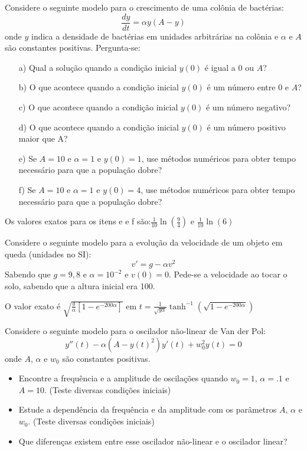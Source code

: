 \begin{exer} Considere o seguinte modelo para o crescimento de uma colônia de bactérias:
$$\frac{dy}{dt}=\alpha y (A-y)$$
onde $y$ indica a densidade de bactérias em unidades arbitrárias na colônia e $\alpha$ e $A$ são constantes positivas.
Pergunta-se:
\begin{itemize}
\item[a)] Qual a solução quando a condição inicial $y(0)$ é igual a $0$ ou $A$?
\item[b)] O que acontece quando a condição inicial $y(0)$ é um número entre $0$ e $A$?
\item[c)] O que acontece quando a condição inicial $y(0)$ é um número negativo?
\item[d)] O que acontece quando a condição inicial $y(0)$ é um número positivo maior que A?
\item[e)] Se $A=10$ e $\alpha=1$ e $y(0)=1$, use métodos numéricos para obter tempo necessário para que a população dobre?
\item[f)] Se $A=10$ e $\alpha=1$ e $y(0)=4$, use métodos numéricos para obter tempo necessário para que a população dobre?
\end{itemize}
\end{exer}
\begin{resp}
  
Os valores exatos para os itens e e f são:$\frac{1}{10}\ln\left(\frac{9}{4}\right)$ e $\frac{1}{10}\ln\left(6\right)$    
  
\end{resp}

\begin{exer} Considere o seguinte modelo para a evolução da velocidade de um objeto em queda (unidades no SI):
$$v'=g-\alpha v^2$$
Sabendo que $g=9,8$ e $\alpha=10^{-2}$ e $v(0)=0$. Pede-se a velocidade ao tocar o solo, sabendo que a altura inicial era 100.

\end{exer}
\begin{resp}
  
O valor exato é $\sqrt{\frac{g}{\alpha}\left[1-e^{{-200\alpha}}\right]}$ em $t=\frac{1}{\sqrt{g\alpha}}\tanh^{-1}\left(\sqrt{1-e^{{-200\alpha}}}\right)$    
  
\end{resp}


\begin{exer} Considere o seguinte modelo para o oscilador não-linear de Van der Pol:
$$y''(t) - \alpha (A-y(t)^2)y'(t) + w_0^2y(t)=0$$
onde $A$, $\alpha$ e $w_0$ são constantes positivas.
\begin{itemize}
\item Encontre a frequência e a amplitude de oscilações quando $w_0=1$, $\alpha=.1$ e $A=10$. (Teste diversas condições iniciais)
\item Estude a dependência da frequência e da amplitude com os parâmetros  $A$, $\alpha$ e $w_0$. (Teste diversas condições iniciais)
\item Que diferenças existem entre esse oscilador não-linear e o oscilador linear?
\end{itemize}
\end{exer}

